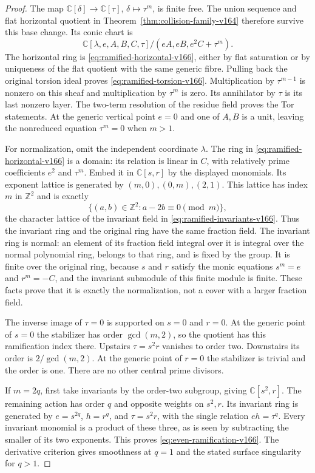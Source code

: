 \documentclass[11pt,reqno]{amsart}
\numberwithin{equation}{section}
\theoremstyle{definition}\newtheorem{definition}[theorem]{Definition}
\theoremstyle{remark}\newtheorem{remark}[theorem]{Remark}
\newcommand{\C}{\mathbb C}\newcommand{\Q}{\mathbb Q}
\begin{document}
\begin{proof}
The map $\C[\delta]\to\C[\tau]$, $\delta\mapsto\tau^m$, is
finite free. The union sequence and flat horizontal quotient in
Theorem~\ref{thm:collision-family-v164} therefore survive this base
change. Its conic chart is
\[
 \C[\lambda,e,A,B,C,\tau]/(eA,eB,e^2C+\tau^m).
\]
The horizontal ring is \eqref{eq:ramified-horizontal-v166}, either
by flat saturation or by uniqueness of the flat quotient with the
same generic fibre. Pulling back the original torsion ideal proves
\eqref{eq:ramified-torsion-v166}. Multiplication by $\tau^{m-1}$
is nonzero on this sheaf and multiplication by $\tau^m$ is zero.
Its annihilator by $\tau$ is its last nonzero layer. The two-term
resolution of the residue field proves the Tor statements. At the
generic vertical point $e=0$ and one of $A,B$ is a unit, leaving
the nonreduced equation $\tau^m=0$ when $m>1$.

For normalization, omit the independent coordinate $\lambda$.
The ring in \eqref{eq:ramified-horizontal-v166} is a domain: its
relation is linear in $C$, with relatively prime coefficients
$e^2$ and $\tau^m$. Embed it in $\C[s,r]$ by the displayed
monomials. Its exponent lattice is generated by
$(m,0),(0,m),(2,1)$. This lattice has index $m$ in $\mathbb Z^2$
and is exactly
\[
 \{(a,b)\in\mathbb Z^2:a-2b\equiv0\pmod m\},
\]
the character lattice of the invariant field in
\eqref{eq:ramified-invariants-v166}. Thus the invariant ring and
the original ring have the same fraction field. The invariant
ring is normal: an element of its fraction field integral over
it is integral over the normal polynomial ring, belongs to that
ring, and is fixed by the group. It is finite over the original
ring, because $s$ and $r$ satisfy the monic equations
$s^m=e$ and $r^m=-C$, and the invariant submodule of this finite
module is finite. These facts prove that it is exactly the
normalization, not a cover with a larger fraction field.

The inverse image of $\tau=0$ is supported on $s=0$ and $r=0$.
At the generic point of $s=0$ the stabilizer has order
$\gcd(m,2)$, so the quotient has this ramification index there.
Upstairs $\tau=s^2r$ vanishes to order two. Downstairs its order
is $2/\gcd(m,2)$. At the generic point of $r=0$ the stabilizer
is trivial and the order is one. There are no other central
prime divisors.

If $m=2q$, first take invariants by the order-two subgroup, giving
$\C[s^2,r]$. The remaining action has order $q$ and opposite
weights on $s^2,r$. Its invariant ring is generated by
$e=s^{2q}$, $h=r^q$, and $\tau=s^2r$, with the single relation
$eh=\tau^q$. Every invariant monomial is a product of these
three, as is seen by subtracting the smaller of its two exponents.
This proves \eqref{eq:even-ramification-v166}. The derivative
criterion gives smoothness at $q=1$ and the stated surface
singularity for $q>1$.
\end{proof}
\end{document}
